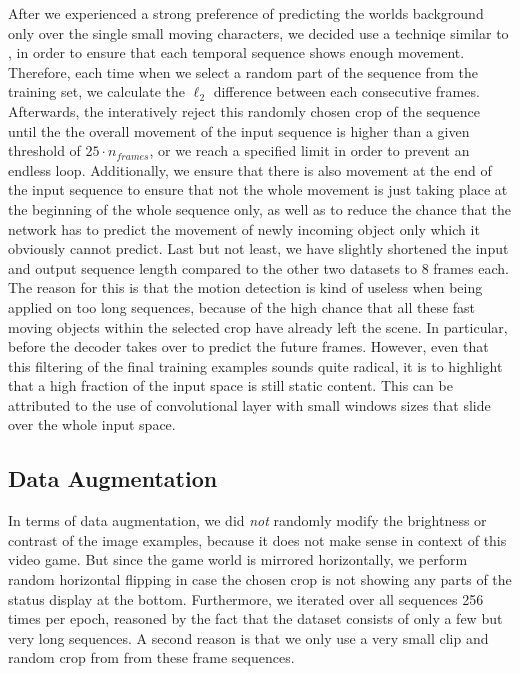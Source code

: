 After we experienced a strong preference of predicting the worlds background only over the single small moving characters, we decided use a techniqe similar to \parencite{deep_multiscale_video_pred}, in order to ensure that each temporal sequence shows enough movement. Therefore, each time when we select a random part of the sequence from the training set, we calculate the $\ell_2$ difference between each consecutive frames. Afterwards, the interatively reject this randomly chosen crop of the sequence until the the overall movement of the input sequence is higher than a given threshold of $25 \cdot n_{frames}$, or we reach a specified limit in order to prevent an endless loop. Additionally, we ensure that there is also movement at the end of the input sequence to ensure that not the whole movement is just taking place at the beginning of the whole sequence only, as well as to reduce the chance that the network has to predict the movement of newly incoming object only which it obviously cannot predict. Last but not least, we have slightly shortened the input and output sequence length compared to the other two datasets to \num{8} frames each. The reason for this is that the motion detection is kind of useless when being applied on too long sequences, because of the high chance that all these fast moving objects within the selected crop have already left the scene. In particular, before the decoder takes over to predict the future frames. However, even that this filtering of the final training examples sounds quite radical, it is to highlight that a high fraction of the input space is still static content. This can be attributed to the use of convolutional layer with small windows sizes that slide over the whole input space.

\subsection{Data Augmentation}

In terms of data augmentation, we did \textit{not} randomly modify the brightness or contrast of the image examples, because it does not make sense in context of this video game. But since the game world is mirrored horizontally, we perform random horizontal flipping in case the chosen crop is not showing any parts of the status display at the bottom. Furthermore, we iterated over all sequences \num{256} times per epoch, reasoned by the fact that the dataset consists of only a few but very long sequences. A second reason is that we only use a very small clip and random crop from from these frame sequences. 

